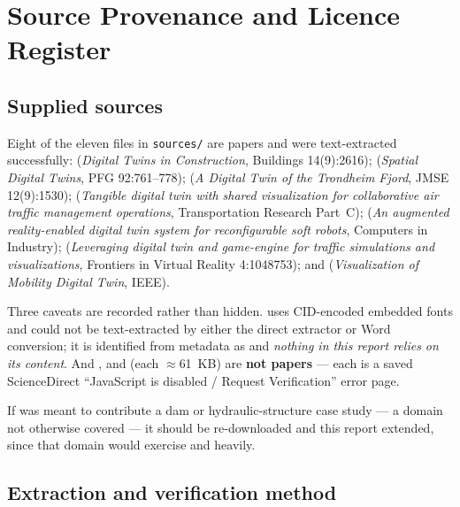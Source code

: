 \section{Source Provenance and Licence Register}
\label{app:sources}

\subsection{Supplied sources}

Eight of the eleven files in \texttt{sources/} are papers and were text-extracted
successfully: \citet{yang2024digital} (\emph{Digital Twins in Construction}, Buildings
14(9):2616); \citet{ali2024spatial} (\emph{Spatial Digital Twins}, PFG 92:761--778);
\citet{vasilijevic2024trondheim} (\emph{A Digital Twin of the Trondheim Fjord}, JMSE
12(9):1530); \citet{chen2024tangible} (\emph{Tangible digital twin with shared
visualization for collaborative air traffic management operations}, Transportation
Research Part~C); \citet{liao2025digital} (\emph{An augmented reality-enabled digital
twin system for reconfigurable soft robots}, Computers in Industry);
\citet{rundel2023leveraging} (\emph{Leveraging digital twin and game-engine for traffic
simulations and visualizations}, Frontiers in Virtual Reality 4:1048753); and
\citet{mobilitydt2023} (\emph{Visualization of Mobility Digital Twin}, IEEE).

Three caveats are recorded rather than hidden. 
uses CID-encoded embedded fonts and could not be text-extracted by either the direct
extractor or Word conversion; it is identified from metadata as \citet{iiot2025llm} and
\emph{nothing in this report relies on its content}. And ,
 and  (each $\approx$61~KB) are \textbf{not papers} --- each
is a saved ScienceDirect ``JavaScript is disabled / Request Verification'' error page.

\begin{keypoint}
If  was meant to contribute a dam or hydraulic-structure case
study --- a domain not otherwise covered --- it should be re-downloaded and this report
extended, since that domain would exercise  and  heavily.
\end{keypoint}

\subsection{Extraction and verification method}

